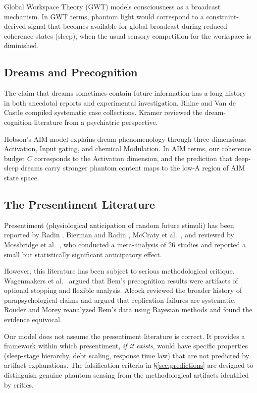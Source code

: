 \documentclass[11pt, a4paper]{article}
\theoremstyle{definition}
\theoremstyle{remark}
\begin{document}
Global Workspace Theory (GWT) \cite{Baars1988,Dehaene2011} models
consciousness as a broadcast mechanism. In GWT terms, phantom light
would correspond to a constraint-derived signal that becomes
available for global broadcast during reduced-coherence states
(sleep), when the usual sensory competition for the workspace is
diminished.

\subsection{Dreams and Precognition}

The claim that dreams sometimes contain future information has a
long history in both anecdotal reports and experimental
investigation. Rhine \cite{Rhine1962} and Van de Castle
\cite{VanDeCastle1994} compiled systematic case collections.
Kramer \cite{Kramer2007} reviewed the dream-cognition literature
from a psychiatric perspective.

Hobson's AIM model \cite{Hobson2000,Hobson2005} explains dream
phenomenology through three dimensions: Activation, Input gating,
and chemical Modulation. In AIM terms, our coherence budget $C$
corresponds to the Activation dimension, and the prediction that
deep-sleep dreams carry stronger phantom content maps to the
low-A region of AIM state space.

\subsection{The Presentiment Literature}

Presentiment (physiological anticipation of random future stimuli)
has been reported by Radin \cite{Radin2004}, Bierman and Radin
\cite{Bierman1997}, McCraty et al.\ \cite{McCraty2004}, and
reviewed by Mossbridge et al.\ \cite{Mossbridge2012}, who conducted
a meta-analysis of 26 studies and reported a small but statistically
significant anticipatory effect.

However, this literature has been subject to serious methodological
critique. Wagenmakers et al.\ \cite{Wagenmakers2012} argued that
Bem's precognition results were artifacts of optional stopping and
flexible analysis. Alcock \cite{Alcock2003} reviewed the broader
history of parapsychological claims and argued that replication
failures are systematic. Rouder and Morey \cite{Rouder2011}
reanalyzed Bem's data using Bayesian methods and found the evidence
equivocal.

Our model does not assume the presentiment literature is correct.
It provides a framework within which presentiment, \emph{if it
exists}, would have specific properties (sleep-stage hierarchy,
debt scaling, response time law) that are not predicted by artifact
explanations. The falsification criteria in \S\ref{sec:predictions}
are designed to distinguish genuine phantom sensing from the
methodological artifacts identified by critics.
\end{document}
